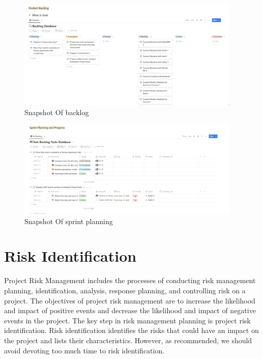 \newpage

\begin{figure}[h!]
	\centering
	\includegraphics[width=0.95\textwidth]{figures/snapshot-of-backlog-database.png}
	\caption{Snapshot Of backlog}
\end{figure}

\begin{figure}[h!]
	\centering
	\includegraphics[width=0.95\textwidth]{figures/snapshot-of-sprint-planning.png}
	\caption{Snapshot Of sprint planning}
\end{figure}

\newpage 

\section{Risk Identification}
Project Risk Management includes the processes of conducting 
risk management planning, identification, analysis, response 
planning, and controlling risk on a project. The objectives 
of project risk management are to increase the likelihood and 
impact of positive events and decrease the likelihood and impact 
of negative events in the project. The key step in risk management
planning is project risk identification. Risk identification
identifies the risks that could have an impact on the project 
and lists their characteristics. However, as recommended, we should
avoid devoting too much time to risk identification.

